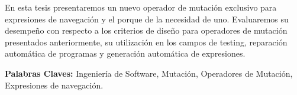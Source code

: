 
En esta tesis presentaremos un nuevo operador de mutaci\'on exclusivo para expresiones de navegaci\'on y el porque de la necesidad de uno. Evaluaremos su desempe\~no con respecto a los criterios de dise\~no para operadores de mutaci\'on presentados anteriormente, su utilizaci\'on en los campos de testing, reparaci\'on autom\'atica de programas y generaci\'on autom\'atica de expresiones.

\noindent
\textbf{Palabras Claves:} Ingenier\'ia de Software, Mutaci\'on, Operadores de Mutaci\'on, Expresiones de navegaci\'on.\\








